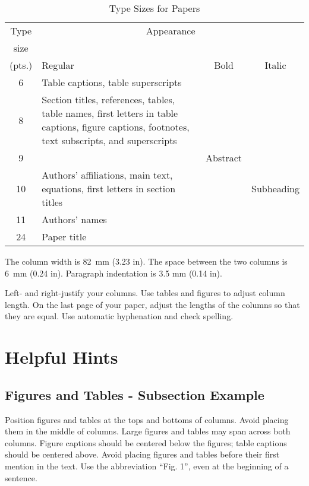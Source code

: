 \begin{table}[hb]
\begin{center} \caption{Type Sizes for Papers}
\label{table1}
\renewcommand{\arraystretch}{1.3}
\begin{tabular}{|c|p{34mm}|c|c|}
 \hline
Type & \multicolumn{3}{c|}{Appearance} \\
size &\multicolumn{3}{c|}{~} \\ \cline{2-4} (pts.) & Regular &
Bold & Italic \\ \hline
 6 & Table captions\footnotemark[1], table superscripts & & \\ \hline
 8 & Section titles\footnotemark[1], references, tables, table
 names\footnotemark[1],
 first letters in table captions\footnotemark[1], figure captions, footnotes,
 text subscripts, and superscripts &
& \\ \hline
 9 & & Abstract & \\ \hline
 10 & Authors' affiliations, main text, equations, first letters in
 section titles\footnotemark[1] & & Subheading \\ \hline
 11 & Authors' names & & \\ \hline
 24 & Paper title & & \\ \hline
\end{tabular}
\end{center}
\end{table}

The column width is 82~mm (3.23 in). The space between the two columns is
6~mm (0.24 in). Paragraph indentation is 3.5 mm (0.14 in).

Left- and right-justify your columns. Use tables and figures to
adjust column length. On the last page of your paper, adjust the
lengths of the columns so that they are equal. Use automatic
hyphenation and check spelling.


\section{Helpful Hints}

\subsection{Figures and Tables - Subsection Example}

Position figures and tables at the tops and bottoms of columns. Avoid
placing them in the middle of columns. Large figures and tables may span
across both columns. Figure captions should be centered below the figures;
table captions should be centered above. Avoid placing figures and tables
before their first mention in the text. Use the abbreviation ``Fig. 1'',
even at the beginning of a sentence.

